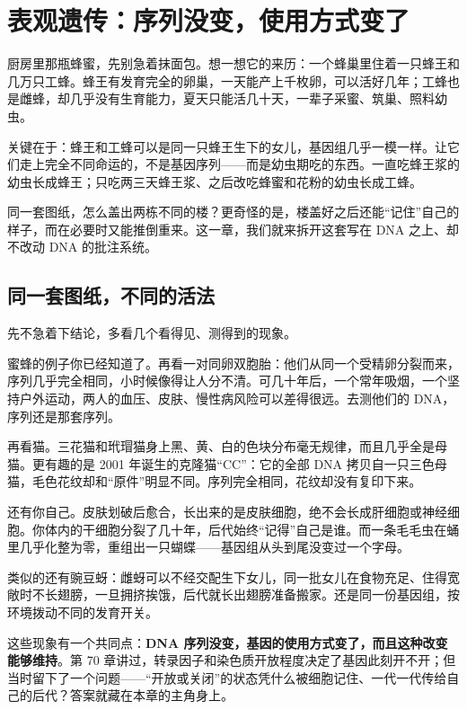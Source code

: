 \chapter{表观遗传：序列没变，使用方式变了}

\begin{kaichang}
厨房里那瓶蜂蜜，先别急着抹面包。想一想它的来历：一个蜂巢里住着一只蜂王和几万只工蜂。蜂王有发育完全的卵巢，一天能产上千枚卵，可以活好几年；工蜂也是雌蜂，却几乎没有生育能力，夏天只能活几十天，一辈子采蜜、筑巢、照料幼虫。

关键在于：蜂王和工蜂可以是同一只蜂王生下的女儿，基因组几乎一模一样。让它们走上完全不同命运的，不是基因序列——而是幼虫期吃的东西。一直吃蜂王浆的幼虫长成蜂王；只吃两三天蜂王浆、之后改吃蜂蜜和花粉的幼虫长成工蜂。

同一套图纸，怎么盖出两栋不同的楼？更奇怪的是，楼盖好之后还能“记住”自己的样子，而在必要时又能推倒重来。这一章，我们就来拆开这套写在 DNA 之上、却不改动 DNA 的批注系统。
\end{kaichang}

\section{同一套图纸，不同的活法}

先不急着下结论，多看几个看得见、测得到的现象。

蜜蜂的例子你已经知道了。再看一对同卵双胞胎：他们从同一个受精卵分裂而来，序列几乎完全相同，小时候像得让人分不清。可几十年后，一个常年吸烟，一个坚持户外运动，两人的血压、皮肤、慢性病风险可以差得很远。去测他们的 DNA，序列还是那套序列。

再看猫。三花猫和玳瑁猫身上黑、黄、白的色块分布毫无规律，而且几乎全是母猫。更有趣的是 2001 年诞生的克隆猫“CC”：它的全部 DNA 拷贝自一只三色母猫，毛色花纹却和“原件”明显不同。序列完全相同，花纹却没有复印下来。

还有你自己。皮肤划破后愈合，长出来的是皮肤细胞，绝不会长成肝细胞或神经细胞。你体内的干细胞分裂了几十年，后代始终“记得”自己是谁。而一条毛毛虫在蛹里几乎化整为零，重组出一只蝴蝶——基因组从头到尾没变过一个字母。

类似的还有豌豆蚜：雌蚜可以不经交配生下女儿，同一批女儿在食物充足、住得宽敞时不长翅膀，一旦拥挤挨饿，后代就长出翅膀准备搬家。还是同一份基因组，按环境拨动不同的发育开关。

这些现象有一个共同点：\textbf{DNA 序列没变，基因的使用方式变了，而且这种改变能够维持}。第 70 章讲过，转录因子和染色质开放程度决定了基因此刻开不开；但当时留下了一个问题——“开放或关闭”的状态凭什么被细胞记住、一代一代传给自己的后代？答案就藏在本章的主角身上。

